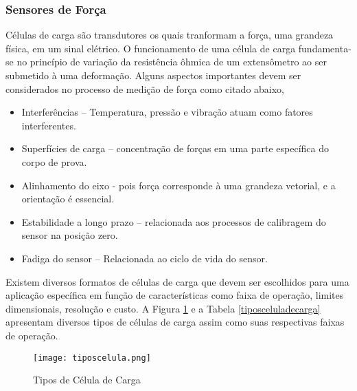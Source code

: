 			\subsubsection{Sensores de Força}

				Células de carga são transdutores os quais tranformam a força, uma grandeza física, em um sinal elétrico. O funcionamento de uma célula de carga fundamenta-se no princípio de variação da resistência ôhmica de um extensômetro ao ser submetido à uma deformação. Alguns aspectos importantes devem ser considerados no processo de medição de força como  citado abaixo,
			\begin{itemize}

			\item Interferências – Temperatura, pressão e vibração atuam como fatores interferentes.
			\item Superfícies de carga – concentração de forças em uma parte específica do corpo de prova.
			\item Alinhamento do eixo -  pois força corresponde à uma grandeza vetorial, e a orientação é essencial.
			\item Estabilidade a longo prazo – relacionada aos processos de calibragem do sensor na posição zero.
			\item Fadiga do sensor – Relacionada ao ciclo de vida do sensor.
			\end{itemize}

				Existem diversos formatos de células de carga que devem ser escolhidos para uma aplicação específica em função de características como faixa de operação, limites dimensionais, resolução e custo. A Figura \ref{tiposcelula} e a Tabela \ref{tiposceluladecarga} apresentam diversos tipos de células de carga assim como suas respectivas faixas de operação.
				
			\begin{figure}[!h]
				\centering
				\texttt{[image: tiposcelula.png]}
				\caption{Tipos de Célula de Carga}
				\label{tiposcelula}
			\end{figure}

